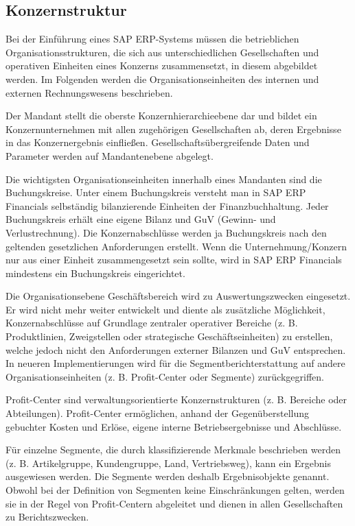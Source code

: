 \subsection{Konzernstruktur}
Bei der Einführung eines SAP ERP-Systems müssen die betrieblichen Organisationsstrukturen, die sich aus unterschiedlichen Gesellschaften und operativen Einheiten eines Konzerns zusammensetzt, in diesem abgebildet werden.
Im Folgenden werden die Organisationseinheiten des internen und externen Rechnungswesens beschrieben.

Der Mandant stellt die oberste Konzernhierarchieebene dar und bildet ein Konzernunternehmen mit allen zugehörigen Gesellschaften ab, deren Ergebnisse in das Konzernergebnis einfließen. Gesellschaftsübergreifende Daten und Parameter werden auf Mandantenebene abgelegt.

Die wichtigsten Organisationseinheiten innerhalb eines Mandanten sind die Buchungskreise. Unter einem Buchungskreis versteht man in SAP ERP Financials selbständig bilanzierende Einheiten der Finanzbuchhaltung. Jeder Buchungskreis erhält eine eigene Bilanz und GuV (Gewinn- und Verlustrechnung). Die Konzernabschlüsse werden ja Buchungskreis nach den geltenden gesetzlichen Anforderungen erstellt. Wenn die Unternehmung/Konzern nur aus einer Einheit zusammengesetzt sein sollte, wird in SAP ERP Financials mindestens ein Buchungskreis eingerichtet.

Die Organisationsebene Geschäftsbereich wird zu Auswertungszwecken eingesetzt. Er wird nicht mehr weiter entwickelt und diente als zusätzliche Möglichkeit, Konzernabschlüsse auf Grundlage zentraler operativer Bereiche (z. B. Produktlinien, Zweigstellen oder strategische Geschäftseinheiten) zu erstellen, welche jedoch nicht den Anforderungen externer Bilanzen und GuV entsprechen. In neueren Implementierungen wird für die Segmentberichterstattung auf andere Organisationseinheiten (z. B. Profit-Center oder Segmente) zurückgegriffen.

Profit-Center sind verwaltungsorientierte Konzernstrukturen (z. B. Bereiche oder Abteilungen). Profit-Center ermöglichen, anhand der Gegenüberstellung gebuchter Kosten und Erlöse, eigene interne Betriebsergebnisse und Abschlüsse.

Für einzelne Segmente, die durch klassifizierende Merkmale beschrieben werden (z. B. Artikelgruppe, Kundengruppe, Land, Vertriebsweg), kann ein Ergebnis ausgewiesen werden. Die Segmente werden deshalb Ergebnisobjekte genannt. Obwohl bei der Definition von Segmenten keine Einschränkungen gelten, werden sie in der Regel von Profit-Centern abgeleitet und dienen in allen Gesellschaften zu Berichtszwecken. 

